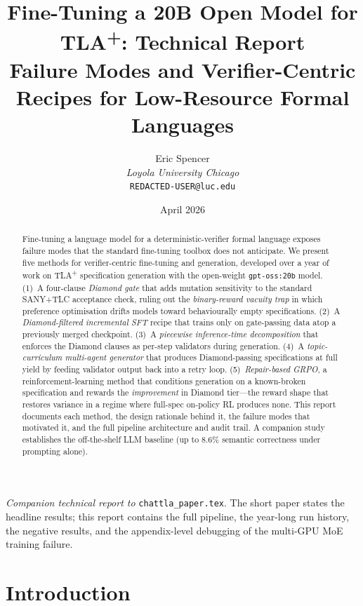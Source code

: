 \documentclass[11pt]{article}
\title{Fine-Tuning a 20B Open Model for TLA\textsuperscript{+}:
Technical Report\\
\large Failure Modes and Verifier-Centric Recipes for Low-Resource Formal Languages}
\author{Eric Spencer\\
\small \textit{Loyola University Chicago}\\
\small \texttt{REDACTED-USER@luc.edu}}
\date{April 2026}
\begin{document}
\maketitle

\begin{center}
\small
\textit{Companion technical report to} \texttt{chattla\_paper.tex}. The
short paper states the headline results; this report contains the full
pipeline, the year-long run history, the negative results, and the
appendix-level debugging of the multi-GPU MoE training failure.
\end{center}

\begin{abstract}
Fine-tuning a language model for a deterministic-verifier formal language
exposes failure modes that the standard fine-tuning toolbox does not
anticipate. We present five methods for verifier-centric fine-tuning and
generation, developed over a year of work on TLA\textsuperscript{+}
specification generation with the open-weight \texttt{gpt-oss:20b}
model. (1)~A four-clause \emph{Diamond gate} that adds mutation
sensitivity to the standard SANY+TLC acceptance check, ruling out
the \emph{binary-reward vacuity trap} in which preference optimisation
drifts models toward behaviourally empty specifications. (2)~A
\emph{Diamond-filtered incremental SFT} recipe that trains only on
gate-passing data atop a previously merged checkpoint.
(3)~A \emph{piecewise inference-time decomposition} that enforces
the Diamond clauses as per-step validators during generation.
(4)~A \emph{topic-curriculum multi-agent generator} that produces
Diamond-passing specifications at full yield by feeding validator
output back into a retry loop. (5)~\emph{Repair-based GRPO}, a
reinforcement-learning method that conditions generation on a
known-broken specification and rewards the \emph{improvement} in
Diamond tier---the reward shape that restores variance in a regime
where full-spec on-policy RL produces none. This report documents
each method, the design rationale behind it, the failure modes that
motivated it, and the full pipeline architecture and audit trail.
A companion study~\cite{ortiz2026formallm} establishes the
off-the-shelf LLM baseline (up to 8.6\% semantic correctness under
prompting alone).
\end{abstract}

\section{Introduction}
\label{sec:intro}
\end{document}
